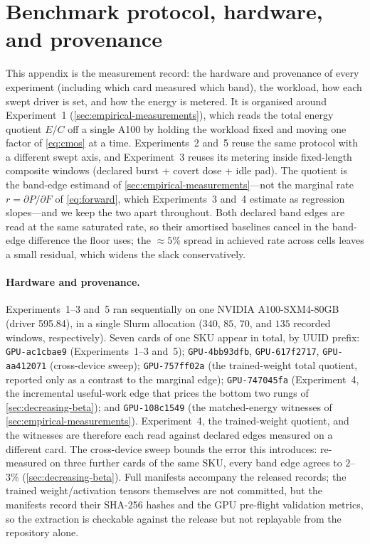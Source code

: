 \documentclass{article}
\theoremstyle{plain}
\theoremstyle{definition}
\theoremstyle{remark}
\begin{document}
\section{Benchmark protocol, hardware, and provenance}
\label{app:bench}

This appendix is the measurement record: the hardware and provenance of
every experiment (including which card measured which band), the workload, how each swept driver is set, and
how the energy is metered. It is organised around Experiment~1
(\cref{sec:empirical-measurements}), which reads the total energy
quotient $E/C$ off a single A100 by holding the workload fixed and moving
one factor of \cref{eq:cmos} at a time. Experiments~2 and~5 reuse the same
protocol with a different swept axis, and Experiment~3 reuses its metering
inside fixed-length composite windows (declared burst + covert dose +
idle pad). The quotient is the band-edge estimand of
\cref{sec:empirical-measurements}---not the marginal rate
$r = \partial P/\partial F$ of \cref{eq:forward}, which Experiments~3
and~4 estimate as regression slopes---and we keep the two apart
throughout. Both declared band edges are read at the same saturated rate,
so their amortised baselines cancel in the band-edge difference the floor
uses; the ${\approx}5\%$ spread in achieved rate across cells leaves a
small residual, which widens the slack conservatively.

\paragraph{Hardware and provenance.}
Experiments~1--3 and~5 ran sequentially on one NVIDIA A100-SXM4-80GB (driver
595.84), in a single Slurm allocation ($340$, $85$, $70$, and $135$ recorded windows, respectively).
Seven cards of
one SKU appear in total, by UUID prefix: \texttt{GPU-ac1cbae9}
(Experiments~1--3 and~5); \texttt{GPU-4bb93dfb}, \texttt{GPU-617f2717},
\texttt{GPU-aa412071} (cross-device sweep); \texttt{GPU-757ff02a} (the
trained-weight total quotient, reported only as a contrast to the marginal
edge); \texttt{GPU-747045fa} (Experiment~4, the incremental useful-work
edge that prices the bottom two rungs of \cref{sec:decreasing-beta}); and
\texttt{GPU-108c1549} (the matched-energy witnesses of
\cref{sec:empirical-measurements}). Experiment~4, the trained-weight
quotient, and the witnesses are therefore each read against declared edges
measured on a different card. The cross-device sweep bounds the error this
introduces: re-measured on three further cards of the same SKU, every band
edge agrees to $2$--$3\%$ (\cref{sec:decreasing-beta}). Full manifests accompany the released
records; the trained weight/activation tensors themselves are not
committed, but the manifests record their SHA-256 hashes and the GPU
pre-flight validation metrics, so the extraction is checkable against the
release but not replayable from the repository alone.
\end{document}
